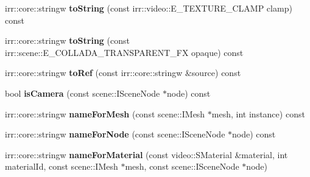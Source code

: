 \begin{DoxyCompactItemize}
\item 
\hypertarget{classirr_1_1scene_1_1_c_collada_mesh_writer_a24678db9725f9be649ba9840146d9638}{irr\-::core\-::stringw {\bfseries to\-String} (const irr\-::video\-::\-E\-\_\-\-T\-E\-X\-T\-U\-R\-E\-\_\-\-C\-L\-A\-M\-P clamp) const }\label{classirr_1_1scene_1_1_c_collada_mesh_writer_a24678db9725f9be649ba9840146d9638}

\item 
\hypertarget{classirr_1_1scene_1_1_c_collada_mesh_writer_a74844c50c605a47470f9de1d442b907e}{irr\-::core\-::stringw {\bfseries to\-String} (const irr\-::scene\-::\-E\-\_\-\-C\-O\-L\-L\-A\-D\-A\-\_\-\-T\-R\-A\-N\-S\-P\-A\-R\-E\-N\-T\-\_\-\-F\-X opaque) const }\label{classirr_1_1scene_1_1_c_collada_mesh_writer_a74844c50c605a47470f9de1d442b907e}

\item 
\hypertarget{classirr_1_1scene_1_1_c_collada_mesh_writer_a7499c03358643e60c6548b4adece69f5}{irr\-::core\-::stringw {\bfseries to\-Ref} (const irr\-::core\-::stringw \&source) const }\label{classirr_1_1scene_1_1_c_collada_mesh_writer_a7499c03358643e60c6548b4adece69f5}

\item 
\hypertarget{classirr_1_1scene_1_1_c_collada_mesh_writer_abf29cee441db38c6038eae8df814cdfe}{bool {\bfseries is\-Camera} (const scene\-::\-I\-Scene\-Node $\ast$node) const }\label{classirr_1_1scene_1_1_c_collada_mesh_writer_abf29cee441db38c6038eae8df814cdfe}

\item 
\hypertarget{classirr_1_1scene_1_1_c_collada_mesh_writer_a7ac6e261ea68eaae45c3e218343bb1cd}{irr\-::core\-::stringw {\bfseries name\-For\-Mesh} (const scene\-::\-I\-Mesh $\ast$mesh, int instance) const }\label{classirr_1_1scene_1_1_c_collada_mesh_writer_a7ac6e261ea68eaae45c3e218343bb1cd}

\item 
\hypertarget{classirr_1_1scene_1_1_c_collada_mesh_writer_ae855fcec372ccbde5b9c271389e282c6}{irr\-::core\-::stringw {\bfseries name\-For\-Node} (const scene\-::\-I\-Scene\-Node $\ast$node) const }\label{classirr_1_1scene_1_1_c_collada_mesh_writer_ae855fcec372ccbde5b9c271389e282c6}

\item 
\hypertarget{classirr_1_1scene_1_1_c_collada_mesh_writer_a2431aa6e5636874643d21bb410fc9d4f}{irr\-::core\-::stringw {\bfseries name\-For\-Material} (const video\-::\-S\-Material \&material, int material\-Id, const scene\-::\-I\-Mesh $\ast$mesh, const scene\-::\-I\-Scene\-Node $\ast$node)}\label{classirr_1_1scene_1_1_c_collada_mesh_writer_a2431aa6e5636874643d21bb410fc9d4f}


\end{DoxyCompactItemize}
